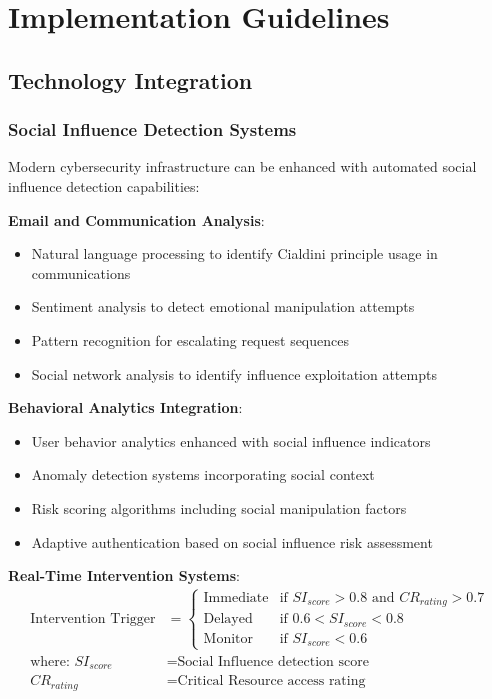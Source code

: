 \documentclass[11pt,a4paper]{article}
\begin{document}
\section{Implementation Guidelines}

\subsection{Technology Integration}

\subsubsection{Social Influence Detection Systems}

Modern cybersecurity infrastructure can be enhanced with automated social influence detection capabilities:

\textbf{Email and Communication Analysis}:
\begin{itemize}
\item Natural language processing to identify Cialdini principle usage in communications
\item Sentiment analysis to detect emotional manipulation attempts
\item Pattern recognition for escalating request sequences
\item Social network analysis to identify influence exploitation attempts
\end{itemize}

\textbf{Behavioral Analytics Integration}:
\begin{itemize}
\item User behavior analytics enhanced with social influence indicators
\item Anomaly detection systems incorporating social context
\item Risk scoring algorithms including social manipulation factors
\item Adaptive authentication based on social influence risk assessment
\end{itemize}

\textbf{Real-Time Intervention Systems}:
\begin{align}
\text{Intervention Trigger} &= \begin{cases}
\text{Immediate} & \text{if } SI_{score} > 0.8 \text{ and } CR_{rating} > 0.7 \\
\text{Delayed} & \text{if } 0.6 < SI_{score} < 0.8 \\
\text{Monitor} & \text{if } SI_{score} < 0.6
\end{cases} \\
\text{where: } SI_{score} &= \text{Social Influence detection score} \\
CR_{rating} &= \text{Critical Resource access rating}
\end{align}
\end{document}
